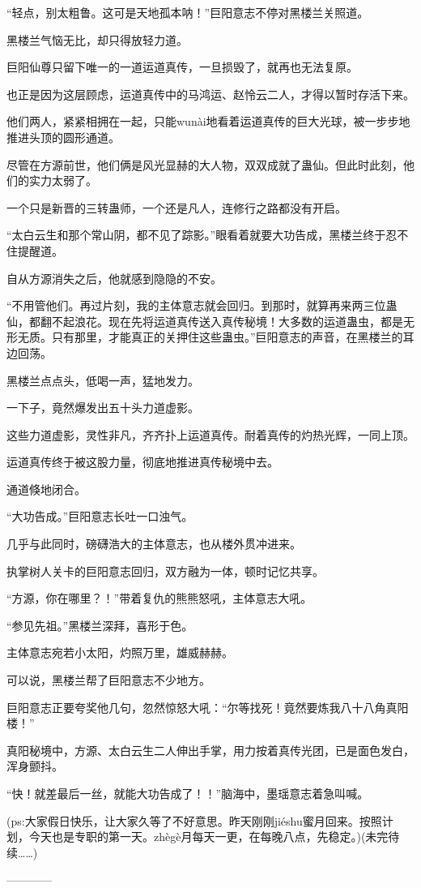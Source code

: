 \begin{this_body}
“轻点，别太粗鲁。这可是天地孤本呐！”巨阳意志不停对黑楼兰关照道。

黑楼兰气恼无比，却只得放轻力道。

巨阳仙尊只留下唯一的一道运道真传，一旦损毁了，就再也无法复原。

也正是因为这层顾虑，运道真传中的马鸿运、赵怜云二人，才得以暂时存活下来。

他们两人，紧紧相拥在一起，只能wunài地看着运道真传的巨大光球，被一步步地推进头顶的圆形通道。

尽管在方源前世，他们俩是风光显赫的大人物，双双成就了蛊仙。但此时此刻，他们的实力太弱了。

一个只是新晋的三转蛊师，一个还是凡人，连修行之路都没有开启。

“太白云生和那个常山阴，都不见了踪影。”眼看着就要大功告成，黑楼兰终于忍不住提醒道。

自从方源消失之后，他就感到隐隐的不安。

“不用管他们。再过片刻，我的主体意志就会回归。到那时，就算再来两三位蛊仙，都翻不起浪花。现在先将运道真传送入真传秘境！大多数的运道蛊虫，都是无形无质。只有那里，才能真正的关押住这些蛊虫。”巨阳意志的声音，在黑楼兰的耳边回荡。

黑楼兰点点头，低喝一声，猛地发力。

一下子，竟然爆发出五十头力道虚影。

这些力道虚影，灵性非凡，齐齐扑上运道真传。耐着真传的灼热光辉，一同上顶。

运道真传终于被这股力量，彻底地推进真传秘境中去。

通道倏地闭合。

“大功告成。”巨阳意志长吐一口浊气。

几乎与此同时，磅礴浩大的主体意志，也从楼外贯冲进来。

执掌树人关卡的巨阳意志回归，双方融为一体，顿时记忆共享。

“方源，你在哪里？！”带着复仇的熊熊怒吼，主体意志大吼。

“参见先祖。”黑楼兰深拜，喜形于色。

主体意志宛若小太阳，灼照万里，雄威赫赫。

可以说，黑楼兰帮了巨阳意志不少地方。

巨阳意志正要夸奖他几句，忽然惊怒大吼：“尔等找死！竟然要炼我八十八角真阳楼！”

真阳秘境中，方源、太白云生二人伸出手掌，用力按着真传光团，已是面色发白，浑身颤抖。

“快！就差最后一丝，就能大功告成了！！”脑海中，墨瑶意志着急叫喊。

(ps:大家假日快乐，让大家久等了不好意思。昨天刚刚jiéshu蜜月回来。按照计划，今天也是专职的第一天。zhègè月每天一更，在每晚八点，先稳定。)(未完待续……)

------------

\end{this_body}

